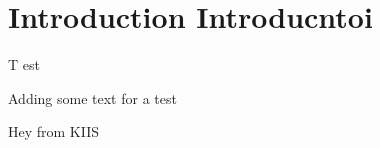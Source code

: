 

\section{Introduction Introducntoi}

\lettrine{T}{ }est
\lipsum


Adding some text for a test

Hey from KIIS
